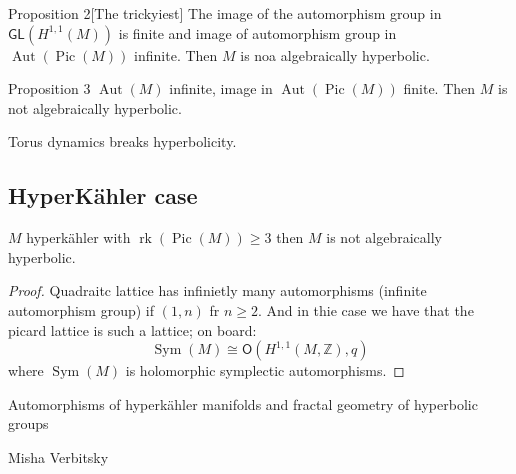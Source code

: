 \begin{thing4}{Proposition 2}[The trickyiest]\leavevmode
	The image of the automorphism group in $\mathsf{GL}(H^{1,1}(M))$ is finite and image of automorphism group in $\operatorname{Aut}(\operatorname{Pic}(M))$ infinite. Then $M$ is noa algebraically hyperbolic.
\end{thing4}

\begin{thing3}{Proposition 3}\leavevmode
	$\operatorname{Aut}(M)$ infinite, image in $\operatorname{Aut}(\operatorname{Pic}(M))$ finite. Then $M$ is not algebraically hyperbolic.
\end{thing3}

\begin{upshot}\leavevmode
	Torus dynamics breaks hyperbolicity.
\end{upshot}

\subsection{HyperKähler case}

\begin{thm}[Them?]\leavevmode
$M$ hyperkähler with $\operatorname{rk}(\operatorname{Pic}(M))\geq 3$ then $M$ is not algebraically hyperbolic.
\end{thm}

\begin{proof}\leavevmode
Quadraitc lattice has infinietly many automorphisms (infinite automorphism group) if $(1,n)$ fr  $n\geq  2$. And in thie case we have that the picard  lattice is such a lattice; on board:
\[\operatorname{Sym}(M)\cong\mathsf{O}(H^{1,1}(M,\mathbb{Z}),q)\]
where $\operatorname{Sym}(M)$ is holomorphic symplectic automorphisms.

\end{proof}

\clearpage{}
{\Huge Automorphisms of hyperkähler manifolds and fractal geometry of hyperbolic groups}

\hfill{\Large Misha Verbitsky}

